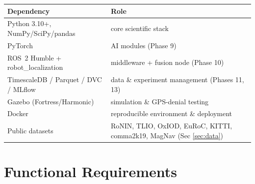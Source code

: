 \documentclass[11pt]{article}
\begin{document}
\begin{center}\footnotesize
\begin{tabular}{@{}p{3.4cm}p{9.0cm}@{}}
\toprule
\textbf{Dependency} & \textbf{Role}\\
\midrule
Python 3.10+, NumPy/SciPy/pandas & core scientific stack\\
PyTorch & AI modules (Phase 9)\\
ROS~2 Humble + robot\_localization & middleware + fusion node (Phase 10)\\
TimescaleDB / Parquet / DVC / MLflow & data \& experiment management (Phases 11, 13)\\
Gazebo (Fortress/Harmonic) & simulation \& GPS-denial testing\\
Docker & reproducible environment \& deployment\\
Public datasets & RoNIN, TLIO, OxIOD, EuRoC, KITTI, comma2k19, MagNav (Sec \ref{sec:data})\\
\bottomrule
\end{tabular}
\end{center}

\section{Functional Requirements}\label{sec:fr}
\end{document}
